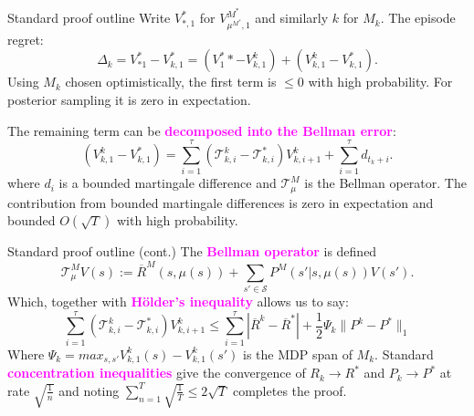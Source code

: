 \documentclass{beamer}
\newcommand{\Sc}{\mathcal{S}}
\newcommand{\Tc}{\mathcal{T}}
\newcommand{\bspace}{\vspace{3mm}}
\newcommand{\hilite}[1]{\textcolor{magenta}{\textbf{#1}}}
\begin{document}
\begin{frame}{Standard proof outline}
Write $V^*_{*,1}$ for $V^{M^*}_{\mu^{M^*}, 1}$ and similarly $k$ for $M_k$.
The episode regret:
$$\Delta_k = V^*_{*1} - V^*_{k,1}
= \left(V^*_{1}* - V^k_{k,1} \right) + \left(V^k_{k,1} - V^*_{k,1} \right) .$$
Using $M_k$ chosen optimistically, the first term is $\le 0$ with high probability.
For posterior sampling it is zero in expectation.
\bspace

The remaining term can be \hilite{decomposed into the Bellman error}:
\begin{equation*}
    \left(V^k_{k,1} - V^*_{k,1} \right) = \sum_{i=1}^\tau \left( \Tc^k_{k,i} - \Tc^*_{k,i} \right) V^k_{k,i+1} + \sum_{i=1}^\tau d_{t_k+i}.
\end{equation*}
where $d_i$ is a bounded martingale difference and $\Tc^M_\mu$ is the Bellman operator.
The contribution from bounded martingale differences is zero in expectation and bounded $O(\sqrt{T})$ with high probability.
\end{frame}

\begin{frame}{Standard proof outline (cont.)}
The \hilite{Bellman operator} is defined
$$\mathcal{T}_{\mu}^{M} V(s) := \overline{R}^{M} (s, \mu(s)) + \sum_{s' \in \Sc} P^{M}(s' | s, \mu(s)) V(s').$$
Which, together with \hilite{H\"{o}lder's inequality} allows us to say:
\begin{equation*}
\label{eq: err sums}
    \sum_{i=1}^\tau \left( \Tc^k_{k,i} - \Tc^*_{k,i} \right) V^k_{k,i+1} \le
        \sum_{i=1}^\tau |\overline{R}^k - \overline{R}^* | + \frac{1}{2} \Psi_k \|P^k - P^* \|_1
\end{equation*}
Where $\Psi_k = max_{s,s'} V^k_{k,1}(s) - V^k_{k,1}(s')$ is the MDP span of $M_k$.
Standard \hilite{concentration inequalities} \cite{weissman2003inequalities} give the convergence of $R_k \rightarrow R^*$ and $P_k \rightarrow P^*$ at rate $\sqrt{\frac{1}{n}}$ and noting $\sum_{n=1}^T \sqrt{\frac{1}{T}} \le 2 \sqrt{T}$ completes the proof.
\end{frame}
\end{document}
